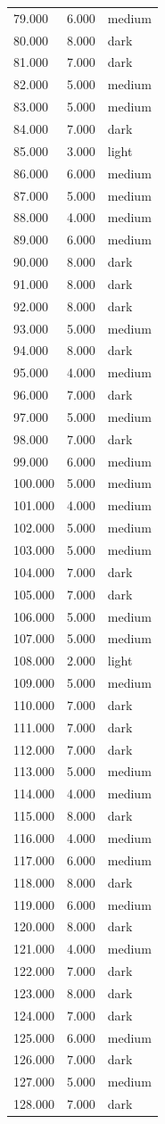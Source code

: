 \begin{tabular}{lll}
79.000 & 6.000 & medium \\
80.000 & 8.000 & dark \\
81.000 & 7.000 & dark \\
82.000 & 5.000 & medium \\
83.000 & 5.000 & medium \\
84.000 & 7.000 & dark \\
85.000 & 3.000 & light \\
86.000 & 6.000 & medium \\
87.000 & 5.000 & medium \\
88.000 & 4.000 & medium \\
89.000 & 6.000 & medium \\
90.000 & 8.000 & dark \\
91.000 & 8.000 & dark \\
92.000 & 8.000 & dark \\
93.000 & 5.000 & medium \\
94.000 & 8.000 & dark \\
95.000 & 4.000 & medium \\
96.000 & 7.000 & dark \\
97.000 & 5.000 & medium \\
98.000 & 7.000 & dark \\
99.000 & 6.000 & medium \\
100.000 & 5.000 & medium \\
101.000 & 4.000 & medium \\
102.000 & 5.000 & medium \\
103.000 & 5.000 & medium \\
104.000 & 7.000 & dark \\
105.000 & 7.000 & dark \\
106.000 & 5.000 & medium \\
107.000 & 5.000 & medium \\
108.000 & 2.000 & light \\
109.000 & 5.000 & medium \\
110.000 & 7.000 & dark \\
111.000 & 7.000 & dark \\
112.000 & 7.000 & dark \\
113.000 & 5.000 & medium \\
114.000 & 4.000 & medium \\
115.000 & 8.000 & dark \\
116.000 & 4.000 & medium \\
117.000 & 6.000 & medium \\
118.000 & 8.000 & dark \\
119.000 & 6.000 & medium \\
120.000 & 8.000 & dark \\
121.000 & 4.000 & medium \\
122.000 & 7.000 & dark \\
123.000 & 8.000 & dark \\
124.000 & 7.000 & dark \\
125.000 & 6.000 & medium \\
126.000 & 7.000 & dark \\
127.000 & 5.000 & medium \\
128.000 & 7.000 & dark \\
\bottomrule
\end{tabular}
